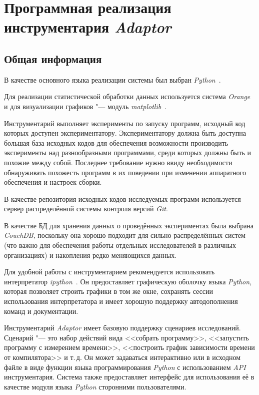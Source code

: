 \section{Программная реализация инструментария \textit{Adaptor}}
\label{sec:construction}
\subsection{Общая информация}
В качестве основного языка реализации системы был выбран \textit{Python}~\cite{python}.

Для реализации статистической обработки данных используется система \textit{Orange}~\cite{orange} и для визуализации графиков "--- модуль \textit{matplotlib}~\cite{matplotlib}.

Инструментарий выполняет эксперименты по запуску программ, исходный код которых доступен экспериментатору. Экспериментатору должна быть доступна большая база исходных кодов для обеспечения возможности производить эксперименты над разнообразными программами, среди которых должны быть и похожие между собой. Последнее требование нужно ввиду необходимости обнаруживать похожесть программ в их поведении при изменении аппаратного обеспечения и настроек сборки.

В качестве репозитория исходных кодов исследуемых программ используется сервер распределённой системы контроля версий \textit{Git}.

В качестве БД для хранения данных о проведённых экспериментах была выбрана \textit{CouchDB}, поскольку она хорошо подходит для сильно распределённых систем (что важно для обеспечения работы отдельных исследователей в различных организациях) и накопления редко меняющихся данных.

Для удобной работы с инструментарием рекомендуется использовать интерпретатор \textit{ipython}~\cite{ipython}. Он предоставляет графическую оболочку языка \textit{Python}, которая позволяет строить графики в том же окне, сохранять сессии использования интерпретатора и имеет хорошую поддержку автодополнения команд и документации.

Инструментарий \textit{Adaptor} имеет базовую поддержку сценариев исследований. Сценарий "--- это набор действий вида <<собрать программу>>, <<запустить программу с измерением времени>>, <<построить график зависимости времени от компилятора>> и т.\,д. Он может задаваться интерактивно или в исходном файле в виде функции языка программирования \textit{Python} с использованием \textit{API} инструментария. Система также предоставляет интерфейс для использования её в качестве модуля языка \textit{Python} сторонними пользователями.


